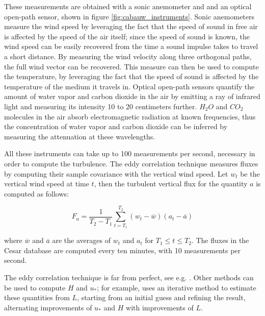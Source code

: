 \documentclass[a4paper,11pt]{kth-mag}
\begin{document}
These measurements are obtained with a sonic anemometer and and an optical open-path sensor, shown in figure \ref{fig:cabauw_instruments}. Sonic anemometers measure the wind speed by leveraging the fact that the speed of sound in free air is affected by the speed of the air itself; since the speed of sound is known, the wind speed can be easily recovered from the time a sound impulse takes to travel a short distance. By measuring the wind velocity along three orthogonal paths, the full wind vector can be recovered. This measure can then be used to compute the temperature, by leveraging the fact that the speed of sound is affected by the temperature of the medium it travels in. Optical open-path sensors quantify the amount of water vapor and carbon dioxide in the air by emitting a ray of infrared light and measuring its intensity 10 to 20 centimeters further. $H_2O$ and $CO_2$ molecules in the air absorb electromagnetic radiation at known frequencies, thus the concentration of water vapor and carbon dioxide can be inferred by measuring the attenuation at these wavelengths.

All these instruments can take up to 100 measurements per second, necessary in order to compute the turbulence. The eddy correlation technique measures fluxes by computing their sample covariance with the vertical wind speed. Let $w_t$ be the vertical wind speed at time $t$, then the turbulent vertical flux for the quantity $a$ is computed as follows:

$$
F_a=\frac{1}{T_2-T_1}\sum_{t=T_1}^{T_2}(w_t-\overline{w})(a_t-\overline{a})
$$

\noindent where $\overline{w}$ and $\overline{a}$ are the averages of $w_t$ and $a_t$ for $T_1\leq t\leq T_2$. The fluxes in the Cesar database are computed every ten minutes, with 10 measurements per second.

The eddy correlation technique is far from perfect, see e.g. \citep{microhandbook, ed_co2}. Other methods can be used to compute $H$ and $u_*$; for example, \cite{cabauw_abl} uses an iterative method to estimate these quantities from $L$, starting from an initial guess and refining the result, alternating improvements of $u_*$ and $H$ with improvements of $L$.
\end{document}
